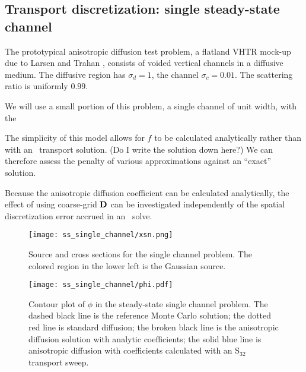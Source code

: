 \subsection{Transport discretization: single steady-state channel}

The prototypical anisotropic diffusion test problem, a flatland VHTR mock-up due
to Larsen and Trahan \cite{Lar2009c}, consists of voided vertical channels in a
diffusive medium. The diffusive region has $\sigma_d=1$, the channel
$\sigma_c=0.01$. The scattering ratio is uniformly $0.99$.

We will use a small portion of this problem, a single channel of unit width,
with the 

The simplicity of this model allows for $f$ to be calculated analytically
rather than with an \SN\ transport solution. (Do I write the solution down
here?) We can therefore assess the penalty of various approximations against an
``exact'' solution.

Because the anisotropic diffusion coefficient can be calculated analytically,
the effect of using coarse-grid $\mathbf{D}$ can be investigated independently of
the spatial discretization error accrued in an \SN\ solve.



\begin{figure}[htb]
  \centering
  \texttt{[image: ss\_single\_channel/xsn.png]}
  \caption[Source and cross sections for the single channel problem.]%
  {Source and cross sections for the single channel problem. The colored region
  in the lower left is the Gaussian source.}
  \label{fig:ssSingleXsn}
\end{figure}

\begin{figure}[htb]
  \centering
  \texttt{[image: ss\_single\_channel/phi.pdf]}
  \caption[Contour plot of $\phi$ in the steady-state single channel
  problem.]{Contour plot of $\phi$ in the steady-state single channel problem.
  The dashed black line is the reference Monte Carlo solution; the dotted red
  line is standard diffusion; the broken black line is the anisotropic
  diffusion solution with analytic coefficients; the solid blue line is
  anisotropic diffusion with coefficients calculated with an S$_{32}$ transport
  sweep.}
  \label{fig:ssSingleContour}
\end{figure}

